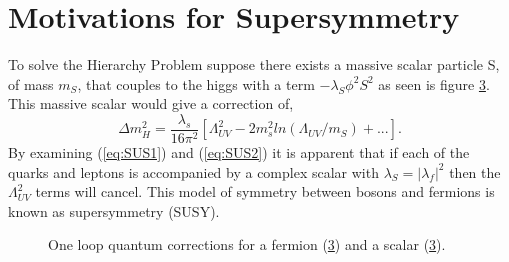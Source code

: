 \section{Motivations for Supersymmetry}
To solve the Hierarchy Problem suppose there exists a massive scalar particle S, 
of mass $m_{S}$, that couples
to the higgs with a term $-\lambda_{S}\phi^{2} S^{2}$ as seen is 
figure \ref{fig:scalarLoop}. This massive scalar would give a correction of,
\begin{equation}
\Delta m_{H}^{2}=\frac{\lambda_{s}}{16\pi^{2}}\left[\Lambda_{UV}^{2}-2m_{s}^{2}ln(\Lambda_{UV}/m_{S})+... \right].
\label{eq:SUS2}
\end{equation}
By examining (\ref{eq:SUS1}) and (\ref{eq:SUS2}) it is apparent that if each of the quarks
and leptons is accompanied by a complex scalar with $\lambda_{S}=|\lambda_{f}|^{2}$  %
then the $\Lambda_{UV}^{2}$ terms will cancel. This model of symmetry between bosons
and fermions is known as supersymmetry (SUSY).

\begin{figure}[hb]
  \centering
  \begin{subfigure}[trim = 0mm 0mm 0mm 0mm, clip, width=3cm]{.4\textwidth}
                \caption{}
                \label{fig:fermionLoop}
\end{subfigure}
\begin{subfigure}[trim = 0mm 0mm 0mm 0mm, clip, width=3cm]{.4\textwidth}
	\caption{}
                \label{fig:scalarLoop}
                	
  \end{subfigure}
   \caption[]{One loop quantum corrections for a fermion (\ref{fig:scalarLoop}) and a scalar (\ref{fig:scalarLoop}). }
\end{figure}

